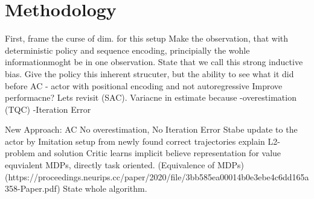 
\chapter{Methodology}
\label{chapter:Methodology}
First, frame the curse of dim. for this setup
Make the observation, that with deterministic policy and sequence encoding, principially the wohle informationmoght be in one observation.
State that we call this strong inductive bias. 
Give the policy this inherent strucuter, but the ability to see what it did before
AC - actor with positional encoding and not autoregressive
Improve performacne? Lets revisit (SAC).
Variacne in estimate because 
-overestimation (TQC)
-Iteration Error

New Approach: AC
No overestimation, No Iteration Error
Stabe update to the actor by Imitation setup from newly found correct trajectories
explain L2-problem and solution
Critic learns implicit believe representation for value equvialent MDPs, directly task oriented. (Equivalence of MDPs) (https://proceedings.neurips.cc/paper/2020/file/3bb585ea00014b0e3ebe4c6dd165a358-Paper.pdf)
State whole algorithm.